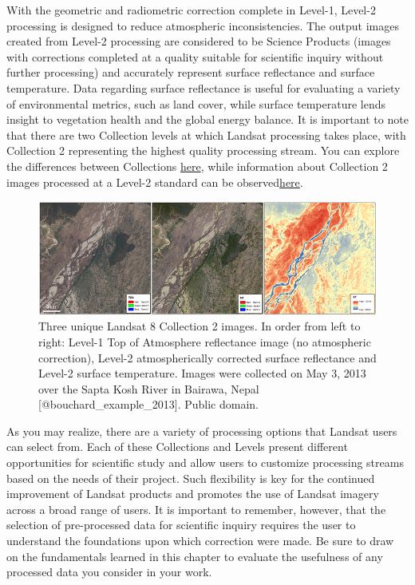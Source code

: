 \documentclass[
]{book}
\begin{document}
With the geometric and radiometric correction complete in Level-1, Level-2 processing is designed to reduce atmospheric inconsistencies. The output images created from Level-2 processing are considered to be Science Products (images with corrections completed at a quality suitable for scientific inquiry without further processing) and accurately represent surface reflectance and surface temperature. Data regarding surface reflectance is useful for evaluating a variety of environmental metrics, such as land cover, while surface temperature lends insight to vegetation health and the global energy balance. It is important to note that there are two Collection levels at which Landsat processing takes place, with Collection 2 representing the highest quality processing stream. You can explore the differences between Collections \href{https://prd-wret.s3.us-west-2.amazonaws.com/assets/palladium/production/atoms/files/Landsat-C1vsC2-2\%2021-0430-LMWS.pdf}{here}, while information about Collection 2 images processed at a Level-2 standard can be observed\href{https://www.usgs.gov/core-science-systems/nli/landsat/landsat-collection-2-level-2-scien\%20e-products}{here}.

\begin{figure}
\includegraphics[width=0.9\linewidth]{images/13-landsat-c2-l2} \caption{Three unique Landsat 8 Collection 2 images. In order from left to right: Level-1 Top of Atmosphere reflectance image (no atmospheric correction), Level-2 atmospherically corrected surface reflectance and Level-2 surface temperature. Images were collected on May 3, 2013 over the Sapta Kosh River in Bairawa, Nepal [@bouchard_example_2013]. Public domain.}\label{fig:13-landsat-c2-l2}
\end{figure}

As you may realize, there are a variety of processing options that Landsat users can select from. Each of these Collections and Levels present different opportunities for scientific study and allow users to customize processing streams based on the needs of their project. Such flexibility is key for the continued improvement of Landsat products and promotes the use of Landsat imagery across a broad range of users. It is important to remember, however, that the selection of pre-processed data for scientific inquiry requires the user to understand the foundations upon which correction were made. Be sure to draw on the fundamentals learned in this chapter to evaluate the usefulness of any processed data you consider in your work.
\end{document}
